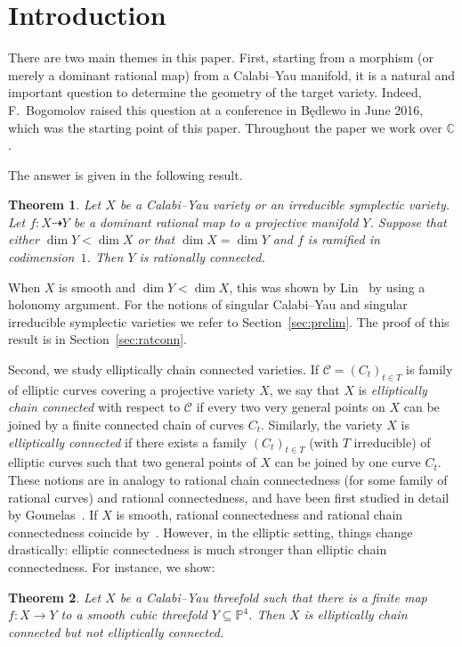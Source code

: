 \documentclass[11pt]{article}
\newtheorem{theo}{Theorem}[section]
\theoremstyle{definition}
\numberwithin{equation}{section}
\numberwithin{figure}{section}
\numberwithin{table}{section}
\newcommand{\Cbb}{\mathbb{C}}
\newcommand{\PS}{\mathbb{P}}
\newcommand\sC{\mathcal{C}}
\begin{document}
\section{Introduction}

There are two main themes in this paper. First, starting from a morphism (or merely a dominant rational map) from a Calabi--Yau manifold, it is a natural and important question to determine the geometry of the target variety. Indeed, F.~Bogomolov raised this question at a conference in B\k{e}dlewo in June 2016, which was the starting point of this paper. Throughout the paper we work over $\Cbb$.

The answer is given in the following result.

\begin{theo}\label{thm:main1}
Let $X$ be a Calabi--Yau variety or an irreducible symplectic variety. Let $f\colon X \dasharrow Y$ be a dominant rational map to a projective manifold $Y$. Suppose that either $\dim Y < \dim X$ or that $\dim X = \dim Y$ and $f$ is ramified in codimension~$1$. Then $Y$ is rationally connected.
\end{theo}

When $X$ is smooth and $\dim Y < \dim X$, this was shown by Lin~\cite[Theorem~1.4]{Lin15} by using a holonomy argument. For the notions of singular Calabi--Yau and singular irreducible symplectic varieties we refer to Section~\ref{sec:prelim}. The proof of this result is in Section~\ref{sec:ratconn}.


Second, we study elliptically chain connected varieties. If $\sC = (C_t)_{t\in T}$ is family of elliptic curves covering a projective variety $X$, we say that $X$ is \emph{elliptically chain connected} with respect to $\sC$ if every two very general points on $X$ can be joined by a finite connected chain of curves $C_t$. Similarly, the variety $X$ is \emph{elliptically connected} if there exists a family $(C_t)_{t\in T}$ (with $T$ irreducible) of elliptic curves such that two general points of $X$ can be joined by one curve $C_t$. These notions are in analogy to rational chain connectedness (for some family of rational curves) and rational connectedness, and have been first studied in detail by Gounelas~\cite{Gou16}. If $X$ is smooth, rational connectedness and rational chain connectedness coincide by~\cite[2.1]{KMM92}. However, in the elliptic setting, things change drastically: elliptic connectedness is much stronger than elliptic chain connectedness. For instance, we show:

\begin{theo}\label{thm:main1.2}
Let $X$ be a Calabi--Yau threefold such that there is a finite map $f \colon X \to Y$ to a smooth cubic threefold $Y \subseteq \PS^4$. Then $X$ is elliptically chain connected but not elliptically connected.
\end{theo}
\end{document}
